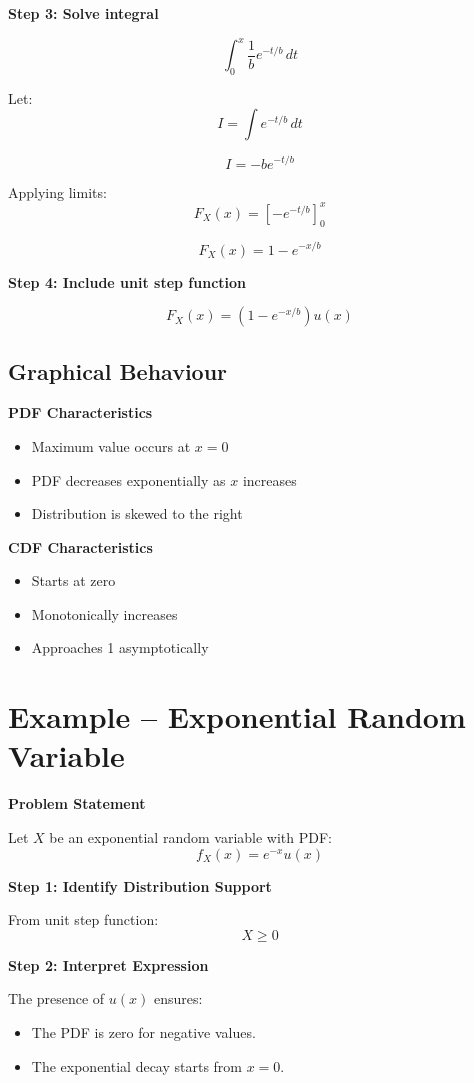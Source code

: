 \documentclass[12pt]{article}
\begin{document}
\textbf{Step 3: Solve integral}

\[
\int_0^x \frac{1}{b} e^{-t/b} \, dt
\]

Let:
\[
I = \int e^{-t/b} \, dt
\]

\[
I = -b e^{-t/b}
\]

Applying limits:
\[
F_X(x) = \left[-e^{-t/b}\right]_0^x
\]

\[
F_X(x) = 1 - e^{-x/b}
\]

\textbf{Step 4: Include unit step function}

\[
F_X(x) = (1 - e^{-x/b})u(x)
\]

\subsection{Graphical Behaviour}

\textbf{PDF Characteristics}

\begin{itemize}
\item Maximum value occurs at $x = 0$
\item PDF decreases exponentially as $x$ increases
\item Distribution is skewed to the right
\end{itemize}

\textbf{CDF Characteristics}

\begin{itemize}
\item Starts at zero
\item Monotonically increases
\item Approaches 1 asymptotically
\end{itemize}

\section{Example – Exponential Random Variable}

\textbf{Problem Statement}

Let $X$ be an exponential random variable with PDF:
\[
f_X(x) = e^{-x}u(x)
\]

\textbf{Step 1: Identify Distribution Support}

From unit step function:
\[
X \geq 0
\]

\textbf{Step 2: Interpret Expression}

The presence of $u(x)$ ensures:

\begin{itemize}
\item The PDF is zero for negative values.
\item The exponential decay starts from $x = 0$.
\end{itemize}
\end{document}
